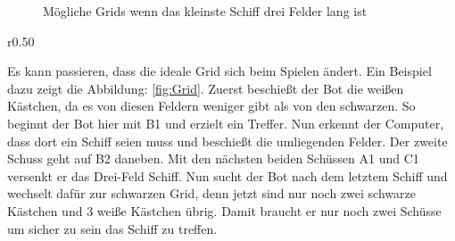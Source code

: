 \documentclass{article}
\begin{document}
\begin{figure}[H]
    \centering
    
    \caption{Mögliche Grids wenn das kleinste Schiff drei Felder lang ist}
    \label{fig:3 field ship grids}
\end{figure}

\begin{wrapfigure}{r}{0.50\textwidth}
    \centering
    
    \caption{Beispiel eines Grid-Wechsels}
    \label{fig:Grid}
\end{wrapfigure}

\par
    Es kann passieren, dass die ideale Grid sich beim Spielen ändert. Ein Beispiel dazu zeigt die Abbildung: \ref{fig:Grid}. Zuerst beschießt der Bot die weißen Kästchen, da es von diesen Feldern weniger gibt als von den schwarzen. So beginnt der Bot hier mit B1 und erzielt ein Treffer. Nun erkennt der Computer, dass dort ein Schiff seien muss und beschießt die umliegenden Felder. Der zweite Schuss geht auf B2 daneben. Mit den nächsten beiden Schüssen A1 und C1 versenkt er das Drei-Feld Schiff. Nun sucht der Bot nach dem letztem Schiff und wechselt dafür zur schwarzen Grid, denn jetzt sind nur noch zwei schwarze Kästchen und 3 weiße Kästchen übrig. Damit braucht er nur noch zwei Schüsse um sicher zu sein das Schiff zu treffen.\\
\end{document}
